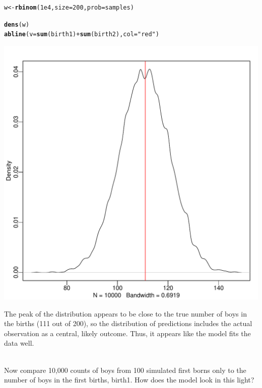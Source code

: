 \documentclass[12pt]{article}\usepackage[]{graphicx}\usepackage[]{color}
\makeatletter
\def\maxwidth{ %
  \ifdim\Gin@nat@width>\linewidth
    \linewidth
  \else
    \Gin@nat@width
  \fi
}
\newcommand{\hlnum}[1]{\textcolor[rgb]{0.686,0.059,0.569}{#1}}%
\newcommand{\hlstr}[1]{\textcolor[rgb]{0.192,0.494,0.8}{#1}}%
\newcommand{\hlopt}[1]{\textcolor[rgb]{0,0,0}{#1}}%
\newcommand{\hlstd}[1]{\textcolor[rgb]{0.345,0.345,0.345}{#1}}%
\newcommand{\hlkwb}[1]{\textcolor[rgb]{0.69,0.353,0.396}{#1}}%
\newcommand{\hlkwc}[1]{\textcolor[rgb]{0.333,0.667,0.333}{#1}}%
\newcommand{\hlkwd}[1]{\textcolor[rgb]{0.737,0.353,0.396}{\textbf{#1}}}%
\newenvironment{kframe}{%
 \def\at@end@of@kframe{}%
 \ifinner\ifhmode%
  \def\at@end@of@kframe{\end{minipage}}%
  \begin{minipage}{\columnwidth}%
 \fi\fi%
 \def\FrameCommand##1{\hskip\@totalleftmargin \hskip-\fboxsep
 \colorbox{shadecolor}{##1}\hskip-\fboxsep
     \hskip-\linewidth \hskip-\@totalleftmargin \hskip\columnwidth}%
 \MakeFramed {\advance\hsize-\width
   \@totalleftmargin\z@ \linewidth\hsize
   \@setminipage}}%
 {\par\unskip\endMakeFramed%
 \at@end@of@kframe}
\newenvironment{knitrout}{}{} %
\newenvironment{problem}[2][Problem]{\begin{trivlist}
\item[\hskip \labelsep {\bfseries #1}\hskip \labelsep {\bfseries #2.}]}{\end{trivlist}}
\makeatother
\begin{document}
\begin{knitrout}
\color{fgcolor}\begin{kframe}
\begin{alltt}
\hlstd{w} \hlkwb{<-} \hlkwd{rbinom}\hlstd{(}\hlnum{1e4}\hlstd{,} \hlkwc{size} \hlstd{=} \hlnum{200}\hlstd{,} \hlkwc{prob} \hlstd{= samples)}

\hlkwd{dens}\hlstd{(w)}
\hlkwd{abline}\hlstd{(}\hlkwc{v} \hlstd{=} \hlkwd{sum}\hlstd{(birth1)} \hlopt{+} \hlkwd{sum}\hlstd{(birth2),} \hlkwc{col} \hlstd{=} \hlstr{"red"}\hlstd{)}
\end{alltt}
\end{kframe}
\includegraphics[width=\maxwidth]{figure/unnamed-chunk-19-1} 

\end{knitrout}

The peak of the distribution appears to be close to the true number of boys in the births (111 out of 200), so the distribution of predictions includes the actual observation as a central, likely outcome. Thus, it appears like the model fits the data well.

\begin{problem}{3H4}
\text{}\\
Now compare 10,000 counts of boys from 100 simulated first borns only to the number of boys in the first births, birth1. How does the model look in this light?
\end{problem}
\end{document}

